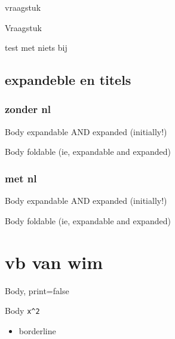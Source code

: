 \documentclass{ximera}
\begin{document}
\begin{question}\nl
vraagstuk
\end{question}

\begin{question}\nl
Vraagstuk
\begin{solution}\nl
test met niets bij
\end{solution}
\end{question}

\subsection{expandeble en titels}
\subsubsection{zonder nl}
\begin{definition}[expandable=true,expanded,title={Veelterm, expandable and expanded}]
 Body expandable AND expanded (initially!)
\end{definition}

\begin{definition}[foldable=true,title={Veelterm, foldable (synonym for expandable and expanded)}]
 Body foldable (ie, expandable and expanded)
\end{definition}
\subsubsection{met nl}
\begin{definition}[expandable=true,expanded,title={Veelterm, expandable and expanded}]\nl
Body  expandable AND expanded (initially!)
\end{definition}

\begin{definition}[foldable=true,title={Veelterm, foldable (synonym for expandable and expanded)}]\nl
Body   foldable (ie, expandable and expanded)
\end{definition}

\section{vb van wim}
\begin{BoxI}[Veelterm,print=false]
  Body, print=false
\end{BoxI}
\begin{BoxI}[Veelterm]
Body  \verb|x^2|
\begin{itemize}
\item borderline
\end{itemize}
\end{BoxI}
\end{document}
